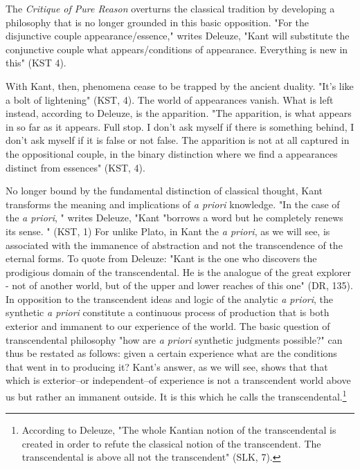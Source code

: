 The \textit{Critique of Pure Reason} overturns the classical tradition by developing a philosophy that is no longer grounded in this basic opposition. "For the disjunctive couple appearance/essence," writes Deleuze, "Kant will substitute the conjunctive couple what appears/conditions of appearance. Everything is new in this" (KST 4).

With Kant, then, phenomena cease to be trapped by the ancient duality. "It's like a bolt of lightening" (KST, 4). The world of appearances vanish. What is left instead, according to Deleuze, is the apparition. "The apparition, is what appears in so far as it appears. Full stop. I don't ask myself if there is something behind, I don't ask myself if it is false or not false. The apparition is not at all captured in the oppositional couple, in the binary distinction where we find a appearances distinct from essences" (KST, 4). 

No longer bound by the fundamental distinction of classical thought, Kant transforms the meaning and implications of \textit{a priori} knowledge. "In the case of the \textit{a priori}, " writes Deleuze, "Kant "borrows a word but he completely renews its sense. " (KST, 1) For unlike Plato, in Kant the \textit{a priori}, as we will see, is associated with the immanence of abstraction and not the transcendence of the eternal forms. To quote from Deleuze: "Kant is the one who discovers the prodigious domain of the transcendental. He is the analogue of the great explorer - not of another world, but of the upper and lower reaches of this one" (DR, 135). In opposition to the transcendent ideas and logic of the analytic \textit{a priori}, the synthetic \textit{a priori} constitute a continuous process of production that is both exterior and immanent to our experience of the world. The basic question of transcendental philosophy "how are \textit{a priori} synthetic judgments possible?" can thus be restated as follows: given a certain experience what are the conditions that went in to producing it? Kant's answer, as we will see, shows that that which is exterior--or independent--of experience is not a transcendent world above us but rather an immanent outside. It is this which he calls the transcendental.\footnote{According to Deleuze, "The whole Kantian notion of the transcendental is created in order to refute the classical notion of the transcendent. The transcendental is above all not the transcendent" (SLK, 7). }

